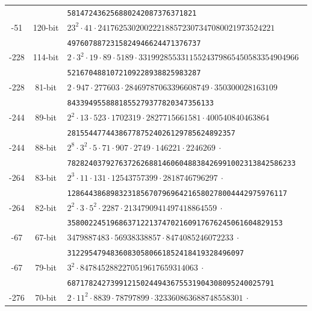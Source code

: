 \documentclass{amsart}
\begin{document}
\begin{table*}[ht]
\begin{tabularx}{\textwidth}{ccl}
         			&   & \tt   581472436256880242087376371821\\  
       	 -51 &  120-bit & \tt $  23^2 \cdot 41 \cdot 241762530200222188572307347080021973524221$  \\
         			&   & \tt    4976078872315824946624471376737\\  
       	 -228 &  114-bit & \tt $  2 \cdot 3^2 \cdot 19 \cdot 89 \cdot 5189 \cdot 33199285533115524379865450583354904966$  \\
         			&   & \tt    5216704881072109228938825983287\\  
       	 -228 &  81-bit & \tt $  2 \cdot 947 \cdot 277603 \cdot 28469787063396608749 \cdot 350300028163109$  \\
         			&   & \tt    8433949558881855279377820347356133\\  
       	 -244 &  89-bit & \tt $  2^2 \cdot  13 \cdot  523 \cdot  1702319 \cdot  2827715661581 \cdot  400540840463864$  \\
         			&   & \tt     281554477443867787524026129785624892357\\  
       	 -244 &  88-bit & \tt $  2^8 \cdot 3^2 \cdot 5 \cdot 71 \cdot 907 \cdot 2749 \cdot 146221 \cdot 2246269 ~\cdot $  \\
         			&   & \tt     78282403792763726268814606048838426991002313842586233\\  			
       	 -264 &  83-bit & \tt $  2^3 \cdot  11 \cdot  131 \cdot  12543757399 \cdot  2818746796297 ~\cdot  $  \\
         			&   & \tt     128644386898323185670796964216580278004442975976117\\  	
       	 -264 &  82-bit & \tt $  2^2 \cdot 3 \cdot 5^2 \cdot 2287 \cdot 2134790941497418864559 ~\cdot  $  \\
         			&   & \tt   35800224519686371221374702160917676245061604829153\\  
       	 -67 &  67-bit & \tt $  3479887483 \cdot 56938338857 \cdot 8474085246072233 ~\cdot  $  \\
         			&   & \tt   31229547948360830580661852418419328496097\\  			
       	 -67 &  79-bit & \tt $  3^2 \cdot 8478452882270519617659314063 ~\cdot  $  \\
         			&   & \tt   687178242739912150244943675531904308095240025791\\  	
       	 -276 &  70-bit & \tt $  2 \cdot 11^2 \cdot 8839 \cdot 78797899 \cdot 323360863688748558301 ~\cdot  $  \\

\end{tabularx}
\end{table*}
\end{document}

